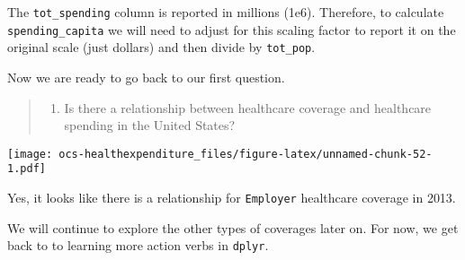 \documentclass[]{article}
\newenvironment{Shaded}{\begin{snugshade}}{\end{snugshade}}
\newcommand{\DataTypeTok}[1]{\textcolor[rgb]{0.13,0.29,0.53}{#1}}
\newcommand{\FloatTok}[1]{\textcolor[rgb]{0.00,0.00,0.81}{#1}}
\newcommand{\KeywordTok}[1]{\textcolor[rgb]{0.13,0.29,0.53}{\textbf{#1}}}
\newcommand{\NormalTok}[1]{#1}
\newcommand{\OperatorTok}[1]{\textcolor[rgb]{0.81,0.36,0.00}{\textbf{#1}}}
\newcommand{\StringTok}[1]{\textcolor[rgb]{0.31,0.60,0.02}{#1}}
\providecommand{\tightlist}{%
  \setlength{\itemsep}{0pt}\setlength{\parskip}{0pt}}
\begin{document}
The \texttt{tot\_spending} column is reported in millions (1e6).
Therefore, to calculate \texttt{spending\_capita} we will need to adjust
for this scaling factor to report it on the original scale (just
dollars) and then divide by \texttt{tot\_pop}.

\begin{Shaded}
\end{Shaded}

Now we are ready to go back to our first question.

\begin{quote}
\begin{enumerate}
\def\labelenumi{\arabic{enumi}.}
\tightlist
\item
  Is there a relationship between healthcare coverage and healthcare
  spending in the United States?
\end{enumerate}
\end{quote}

\begin{Shaded}
\end{Shaded}

\texttt{[image: ocs-healthexpenditure\_files/figure-latex/unnamed-chunk-52-1.pdf]}

Yes, it looks like there is a relationship for \texttt{Employer}
healthcare coverage in 2013.

We will continue to explore the other types of coverages later on. For
now, we get back to to learning more action verbs in \texttt{dplyr}.
\end{document}
